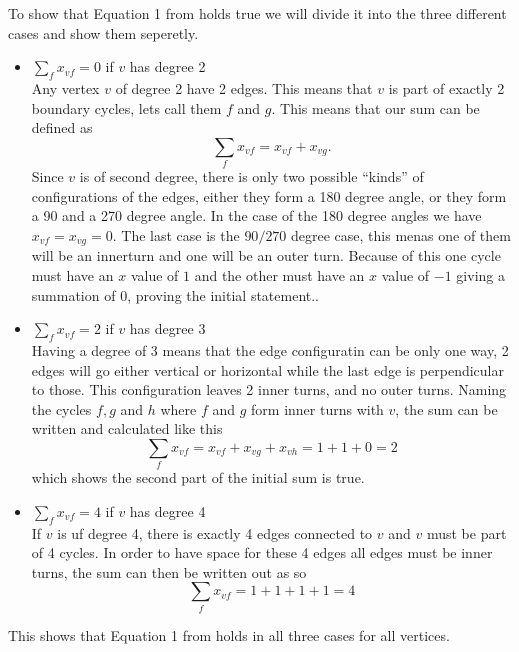 To show that Equation 1 from \cite{assignment1} holds true we will divide it
into the three different cases and show them seperetly.
\begin{itemize}
\item $\sum_f x_{vf} = 0$ if $v$ has degree 2 \\
  Any vertex $v$ of degree 2 have 2 edges. This means that $v$ is part of
  exactly 2 boundary cycles, lets call them $f$ and $g$. This means that our sum
  can be defined as
  \[
    \sum_f x_{vf} = x_{vf} + x_{vg}.
  \]
  Since $v$ is of second degree, there is only two possible ``kinds'' of
  configurations of the edges, either they form a 180 degree angle, or they form
  a 90 and a 270 degree angle.  In the case of the 180 degree angles we have
  $x_{vf} = x_{vg} = 0$. The last case is the $90/270$ degree case, this menas
  one of them will be an innerturn and one will be an outer turn. Because of
  this one cycle must have an $x$ value of $1$ and the other must have an $x$
  value of $-1$ giving a summation of 0, proving the initial statement..
\item $\sum_f x_{vf} = 2$ if $v$ has degree 3 \\
  Having a degree of 3 means that the edge configuratin can be only one way, 2
  edges will go either vertical or horizontal while the last edge is
  perpendicular to those. This configuration leaves 2 inner turns, and no outer
  turns. Naming the cycles $f, g$ and $h$ where $f$ and $g$ form inner turns
  with $v$, the sum can be written and calculated like this
  \[
    \sum_f x_{vf} = x_{vf} + x_{vg} + x_{vh} = 1 + 1 + 0 = 2
  \]
  which shows the second part of the initial sum is true.

\item $\sum_f x_{vf} = 4$ if $v$ has degree 4 \\
  If $v$ is uf degree 4, there is exactly 4 edges connected to $v$ and $v$ must
  be part of 4 cycles. In order to have space for these 4 edges all edges must
  be inner turns, the sum can then be written out as so
  \[
    \sum_f x_{vf} = 1 + 1 + 1 + 1 = 4
  \]
\end{itemize}
%
This shows that Equation 1 from \cite{assignment1} holds in all three cases for
all vertices.
%
